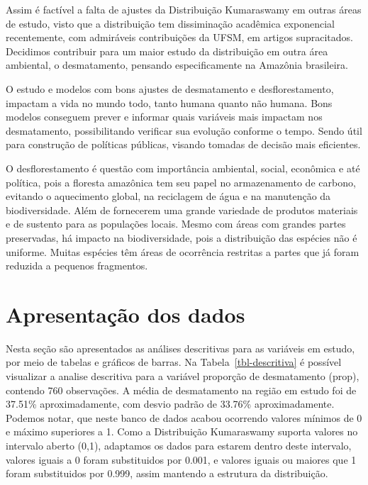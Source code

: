 \documentclass[
]{article}
\begin{document}
Assim é factível a falta de ajustes da Distribuição Kumaraswamy em
outras áreas de estudo, visto que a distribuição tem dissiminação
acadêmica exponencial recentemente, com admiráveis contribuições da
UFSM, em artigos supracitados. Decidimos contribuir para um maior estudo
da distribuição em outra área ambiental, o desmatamento, pensando
especificamente na Amazônia brasileira.

O estudo e modelos com bons ajustes de desmatamento e desflorestamento,
impactam a vida no mundo todo, tanto humana quanto não humana. Bons
modelos conseguem prever e informar quais variáveis mais impactam nos
desmatamento, possibilitando verificar sua evolução conforme o tempo.
Sendo útil para construção de políticas públicas, visando tomadas de
decisão mais eficientes.

O desflorestamento é questão com importância ambiental, social,
econômica e até política, pois a floresta amazônica tem seu papel no
armazenamento de carbono, evitando o aquecimento global, na reciclagem
de água e na manutenção da biodiversidade. Além de fornecerem uma grande
variedade de produtos materiais e de sustento para as populações locais.
Mesmo com áreas com grandes partes preservadas, há impacto na
biodiversidade, pois a distribuição das espécies não é uniforme. Muitas
espécies têm áreas de ocorrência restritas a partes que já foram
reduzida a pequenos fragmentos.

\section{\centering Apresentação dos dados}

Nesta seção são apresentados as análises descritivas para as variáveis
em estudo, por meio de tabelas e gráficos de barras. Na
Tabela~\ref{tbl-descritiva} é possível visualizar a analise descritiva
para a variável proporção de desmatamento (prop), contendo 760
observações. A média de desmatamento na região em estudo foi de 37.51\%
aproximadamente, com desvio padrão de 33.76\% aproximadamente. Podemos
notar, que neste banco de dados acabou ocorrendo valores mínimos de 0 e
máximo superiores a 1. Como a Distribuição Kumaraswamy suporta valores
no intervalo aberto (0,1), adaptamos os dados para estarem dentro deste
intervalo, valores iguais a 0 foram substituidos por 0.001, e valores
iguais ou maiores que 1 foram substituidos por 0.999, assim mantendo a
estrutura da distribuição.
\end{document}
